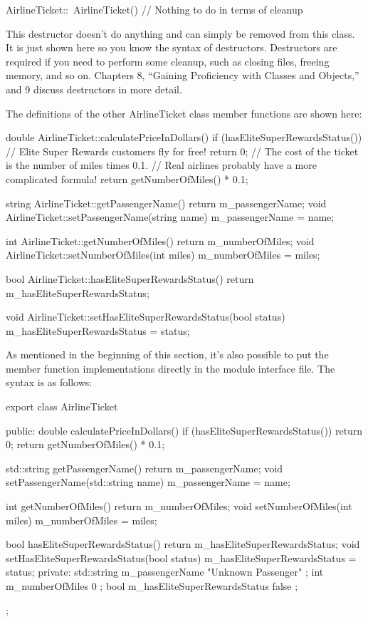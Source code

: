 \begin{cpp}
AirlineTicket::~AirlineTicket()
{
    // Nothing to do in terms of cleanup
}
\end{cpp}

This destructor doesn’t do anything and can simply be removed from this class. It is just shown here so you know the syntax of destructors. Destructors are required if you need to perform some cleanup, such as closing files, freeing memory, and so on. Chapters 8, “Gaining Proficiency with Classes and Objects,” and 9 discuss destructors in more detail.

The definitions of the other AirlineTicket class member functions are shown here:

\begin{cpp}
double AirlineTicket::calculatePriceInDollars()
{
    if (hasEliteSuperRewardsStatus()) {
        // Elite Super Rewards customers fly for free!
        return 0;
    }
    // The cost of the ticket is the number of miles times 0.1.
    // Real airlines probably have a more complicated formula!
    return getNumberOfMiles() * 0.1;
}

string AirlineTicket::getPassengerName() { return m_passengerName; }
void AirlineTicket::setPassengerName(string name) { m_passengerName = name; }

int AirlineTicket::getNumberOfMiles() { return m_numberOfMiles; }
void AirlineTicket::setNumberOfMiles(int miles) { m_numberOfMiles = miles; }

bool AirlineTicket::hasEliteSuperRewardsStatus()
{
    return m_hasEliteSuperRewardsStatus;
}

void AirlineTicket::setHasEliteSuperRewardsStatus(bool status)
{
    m_hasEliteSuperRewardsStatus = status;
}
\end{cpp}

As mentioned in the beginning of this section, it’s also possible to put the member function implementations directly in the module interface file. The syntax is as follows:

\begin{cpp}
export class AirlineTicket
{
    public:
        double calculatePriceInDollars()
        {
            if (hasEliteSuperRewardsStatus()) { return 0; }
            return getNumberOfMiles() * 0.1;
        }

        std::string getPassengerName() { return m_passengerName; }
        void setPassengerName(std::string name) { m_passengerName = name; }

        int getNumberOfMiles() { return m_numberOfMiles; }
        void setNumberOfMiles(int miles) { m_numberOfMiles = miles; }

        bool hasEliteSuperRewardsStatus() { return m_hasEliteSuperRewardsStatus; }
        void setHasEliteSuperRewardsStatus(bool status)
        {
            m_hasEliteSuperRewardsStatus = status;
        }
    private:
        std::string m_passengerName { "Unknown Passenger" };
        int m_numberOfMiles { 0 };
        bool m_hasEliteSuperRewardsStatus { false };
};
\end{cpp}

